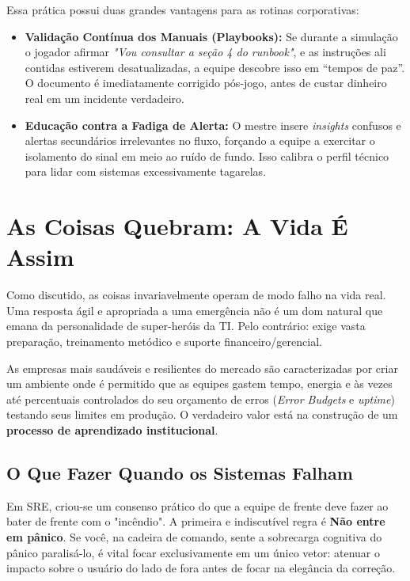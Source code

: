 \documentclass[12pt,a4paper,twoside]{report}
\begin{document}
Essa prática possui duas grandes vantagens para as rotinas corporativas:
\begin{itemize}
    \item \textbf{Validação Contínua dos Manuais (Playbooks):} Se durante a simulação o jogador afirmar \textit{"Vou consultar a seção 4 do runbook"}, e as instruções ali contidas estiverem desatualizadas, a equipe descobre isso em ``tempos de paz''. O documento é imediatamente corrigido pós-jogo, antes de custar dinheiro real em um incidente verdadeiro.
    \item \textbf{Educação contra a Fadiga de Alerta:} O mestre insere \textit{insights} confusos e alertas secundários irrelevantes no fluxo, forçando a equipe a exercitar o isolamento do sinal em meio ao ruído de fundo. Isso calibra o perfil técnico para lidar com sistemas excessivamente tagarelas.
\end{itemize}

\section{As Coisas Quebram: A Vida É Assim}

Como discutido, as coisas invariavelmente operam de modo falho na vida real. Uma resposta ágil e apropriada a uma emergência não é um dom natural que emana da personalidade de super-heróis da TI. Pelo contrário: exige vasta preparação, treinamento metódico e suporte financeiro/gerencial.

As empresas mais saudáveis e resilientes do mercado são caracterizadas por criar um ambiente onde é permitido que as equipes gastem tempo, energia e às vezes até percentuais controlados do seu orçamento de erros (\textit{Error Budgets} e \textit{uptime}) testando seus limites em produção. O verdadeiro valor está na construção de um \textbf{processo de aprendizado institucional}.

\subsection{O Que Fazer Quando os Sistemas Falham}

Em SRE, criou-se um consenso prático do que a equipe de frente deve fazer ao bater de frente com o "incêndio". A primeira e indiscutível regra é \textbf{Não entre em pânico}. Se você, na cadeira de comando, sente a sobrecarga cognitiva do pânico paralisá-lo, é vital focar exclusivamente em um único vetor: atenuar o impacto sobre o usuário do lado de fora antes de focar na elegância da correção.
\end{document}
